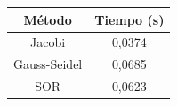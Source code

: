 \begin{homeworkProblem}
\begin{solucion}
    \begin{center}
      \begin{tabular}{|c|c|}
        \hline
        Método & Tiempo (s)\\
        \hline
        Jacobi & 0,0374\\
        \hline
        Gauss-Seidel & 0,0685\\
        \hline
        SOR & 0,0623\\
        \hline
      \end{tabular}        
    \end{center}
  \end{solucion}
\end{homeworkProblem}
